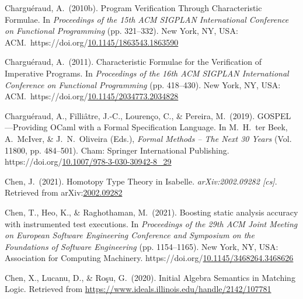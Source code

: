 \documentclass[12pt,twoside]{article}
\begin{document}
{\begin{thebibliography}{1079}
\mdbibitemlabel{}Charguéraud, A.~(2010b). Program Verification Through Characteristic Formulae. In \emph{Proceedings of the 15th ACM SIGPLAN International Conference on Functional Programming} (pp. 321–332). New York, NY, USA: ACM.~https://doi.org/\href{https://dx.doi.org/10.1145/1863543.1863590}{10.1145/1863543.1863590}%

\mdbibitemlabel{}Charguéraud, A.~(2011). Characteristic Formulae for the Verification of Imperative Programs. In \emph{Proceedings of the 16th ACM SIGPLAN International Conference on Functional Programming} (pp. 418–430). New York, NY, USA: ACM.~https://doi.org/\href{https://dx.doi.org/10.1145/2034773.2034828}{10.1145/2034773.2034828}%

\mdbibitemlabel{}Charguéraud, A., Filliâtre, J.-C., Lourenço, C., \& Pereira, M.~(2019). GOSPEL—Providing OCaml with a Formal Specification Language. In M.~H.~ter Beek, A.~McIver, \& J.~N.~Oliveira (Eds.), \emph{Formal Methods – The Next 30 Years} (Vol. 11800, pp. 484–501). Cham: Springer International Publishing. https://doi.org/\href{https://dx.doi.org/10.1007/978-3-030-30942-8_29}{10.1007/978-3-030-30942-8\_29}%

\mdbibitemlabel{}Chen, J.~(2021). Homotopy Type Theory in Isabelle. \emph{arXiv:2002.09282 {}[cs]}. Retrieved from arXiv:\href{http://arxiv.org/abs/2002.09282}{2002.09282}%

\mdbibitemlabel{}Chen, T., Heo, K., \& Raghothaman, M.~(2021). Boosting static analysis accuracy with instrumented test executions. In \emph{Proceedings of the 29th ACM Joint Meeting on European Software Engineering Conference and Symposium on the Foundations of Software Engineering} (pp. 1154–1165). New York, NY, USA: Association for Computing Machinery. https://doi.org/\href{https://dx.doi.org/10.1145/3468264.3468626}{10.1145/3468264.3468626}%

\mdbibitemlabel{}Chen, X., Lucanu, D., \& Roşu, G.~(2020). Initial Algebra Semantics in Matching Logic. Retrieved from \href{https://www.ideals.illinois.edu/handle/2142/107781}{{\ttfamily https://\hspace{0pt}www.\hspace{0pt}ideals.\hspace{0pt}illinois.\hspace{0pt}edu/\hspace{0pt}handle/\hspace{0pt}2142/\hspace{0pt}107781}}%


\end{thebibliography}}
\end{document}
